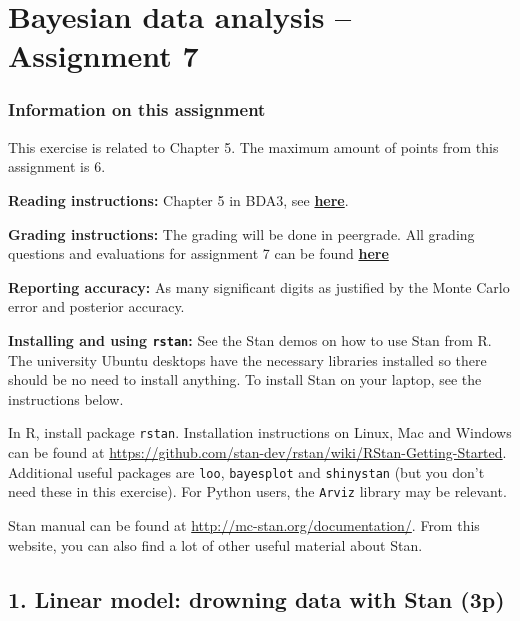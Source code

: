 \documentclass[a4paper,11pt]{article}
\begin{document}


\section*{Bayesian data analysis -- Assignment 7}



\newpage

\subsubsection*{Information on this assignment}
This exercise is related to Chapter 5. The maximum amount of points from this assignment is 6. 

\textbf{Reading instructions:} Chapter 5 in BDA3, see \href{https://github.com/avehtari/BDA_course_Aalto/blob/master/chapter_notes/BDA_notes_ch5.pdf}{\textbf{here}}.

\textbf{Grading instructions:} The grading will be done in peergrade. All grading questions and evaluations for assignment 7 can be found \href{https://github.com/avehtari/BDA_course_Aalto/blob/master/exercises/ex7_rubric.md}{\textbf{here}}

\textbf{Reporting accuracy:} As many significant digits as justified by the Monte Carlo error and posterior accuracy.

\textbf{Installing and using {\tt rstan}:} See the Stan demos on how to use Stan from R. The university Ubuntu desktops have the necessary libraries installed so there should be no need to install anything. To install Stan on your laptop, see the instructions below.

In R, install package {\tt rstan}. Installation instructions on Linux, Mac and Windows can be found at \url{https://github.com/stan-dev/rstan/wiki/RStan-Getting-Started}. Additional useful packages are {\tt loo}, {\tt bayesplot} and {\tt shinystan} (but you don't need these in this exercise). For Python users, the {\tt Arviz} library may be relevant. 

Stan manual can be found at \url{http://mc-stan.org/documentation/}. From this website, you can also find a lot of other useful material about Stan. 

\newpage


\subsection*{1. Linear model: drowning data with Stan (3p)}
\end{document}
